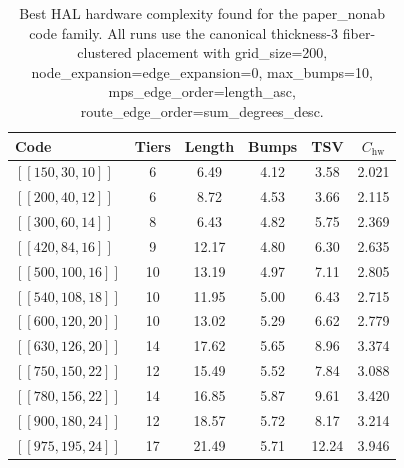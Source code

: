 \begin{table}[h]
\centering
\caption{Best HAL hardware complexity found for the paper\_nonab code family. All runs use the canonical thickness-3 fiber-clustered placement with grid\_size=200, node\_expansion=edge\_expansion=0, max\_bumps=10, mps\_edge\_order=length\_asc, route\_edge\_order=sum\_degrees\_desc.}
\label{tab:paper_nonab_hw}
\begin{tabular}{lccccc}
\toprule
Code & Tiers & Length & Bumps & TSV & $C_{\mathrm{hw}}$ \\
\midrule
$[[150,30,10]]$ & 6 & 6.49 & 4.12 & 3.58 & 2.021 \\
$[[200,40,12]]$ & 6 & 8.72 & 4.53 & 3.66 & 2.115 \\
$[[300,60,14]]$ & 8 & 6.43 & 4.82 & 5.75 & 2.369 \\
$[[420,84,16]]$ & 9 & 12.17 & 4.80 & 6.30 & 2.635 \\
$[[500,100,16]]$ & 10 & 13.19 & 4.97 & 7.11 & 2.805 \\
$[[540,108,18]]$ & 10 & 11.95 & 5.00 & 6.43 & 2.715 \\
$[[600,120,20]]$ & 10 & 13.02 & 5.29 & 6.62 & 2.779 \\
$[[630,126,20]]$ & 14 & 17.62 & 5.65 & 8.96 & 3.374 \\
$[[750,150,22]]$ & 12 & 15.49 & 5.52 & 7.84 & 3.088 \\
$[[780,156,22]]$ & 14 & 16.85 & 5.87 & 9.61 & 3.420 \\
$[[900,180,24]]$ & 12 & 18.57 & 5.72 & 8.17 & 3.214 \\
$[[975,195,24]]$ & 17 & 21.49 & 5.71 & 12.24 & 3.946 \\
\bottomrule
\end{tabular}
\end{table}
